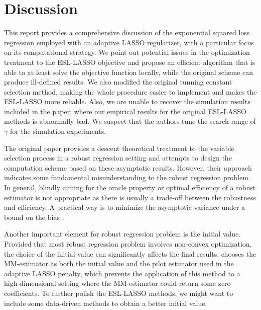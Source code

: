 \section{Discussion} \label{sec:dis}

This report provides a comprehensive discussion of the exponential squared loss regression employed with an adaptive LASSO regularizer, with a particular focus on its computational strategy. We point out potential issues in the optimization treatment to the ESL-LASSO objective and propose an efficient algorithm that is able to at least solve the objective function locally, while the original scheme can produce ill-defined results.
We also modified the original tunning constant selection method, making the whole procedure easier to implement and makes the ESL-LASSO more reliable. Also, we are unable to recover the simulation results included in the paper, where our empirical results for the original ESL-LASSO methods is abnormally bad. We suspect that the authors tune the search range of $\gamma$ for the simulation experiments. 


The original paper provides a descent theoretical treatment to the variable
selection process in a robust regression setting and attempts to design the
computation scheme based on these asymptotic results. However, their approach
indicates some fundamental misunderstanding to the robust regression problem.
In general, blindly aiming for the oracle property or optimal efficiency of a
robust estimator is not appropriate as there is usually a trade-off between the
robustness and efficiency. A practical way is to minimize the asymptotic
variance under a bound on the bias \citep[p. ~68]{maronna2019robust}. 

Another important element for robust regression problem is the initial value. Provided that most robust regression problem involves non-convex optimization, the choice of the initial value can significantly affects the final results. \citet{wang2013robust} chooses the MM-estimator as both the initial value and the pilot estimator used in the adaptive LASSO penalty, which prevents the application of this method to a high-dimensional setting where the MM-estimator could return some zero coefficients. To further polish the ESL-LASSO methods, we might want to include some data-driven methods to obtain a better initial value.

